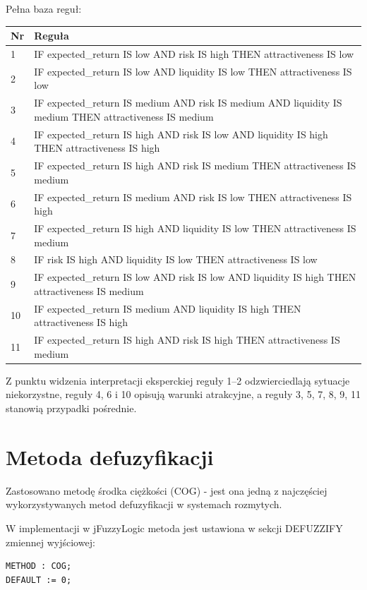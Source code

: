 \documentclass[11pt,a4paper]{article}
\begin{document}
Pełna baza reguł:
\begin{longtable}{ll}
\toprule
Nr & Reguła \\
\midrule
1 & IF expected\_return IS low AND risk IS high THEN attractiveness IS low \\
2 & IF expected\_return IS low AND liquidity IS low THEN attractiveness IS low \\
3 & IF expected\_return IS medium AND risk IS medium AND liquidity IS medium THEN attractiveness IS medium \\
4 & IF expected\_return IS high AND risk IS low AND liquidity IS high THEN attractiveness IS high \\
5 & IF expected\_return IS high AND risk IS medium THEN attractiveness IS medium \\
6 & IF expected\_return IS medium AND risk IS low THEN attractiveness IS high \\
7 & IF expected\_return IS high AND liquidity IS low THEN attractiveness IS medium \\
8 & IF risk IS high AND liquidity IS low THEN attractiveness IS low \\
9 & IF expected\_return IS low AND risk IS low AND liquidity IS high THEN attractiveness IS medium \\
10 & IF expected\_return IS medium AND liquidity IS high THEN attractiveness IS high \\
11 & IF expected\_return IS high AND risk IS high THEN attractiveness IS medium \\
\bottomrule
\end{longtable}

Z punktu widzenia interpretacji eksperckiej reguły 1--2 odzwierciedlają sytuacje niekorzystne,
reguły 4, 6 i 10 opisują warunki atrakcyjne, a reguły 3, 5, 7, 8, 9, 11 stanowią przypadki pośrednie.


\section{Metoda defuzyfikacji}
Zastosowano metodę środka ciężkości (COG) - jest ona jedną z najczęściej
wykorzystywanych metod defuzyfikacji w systemach rozmytych.

W implementacji w jFuzzyLogic metoda jest ustawiona w sekcji DEFUZZIFY zmiennej wyjściowej:
\begin{verbatim}
METHOD : COG;
DEFAULT := 0;
\end{verbatim}
\end{document}
